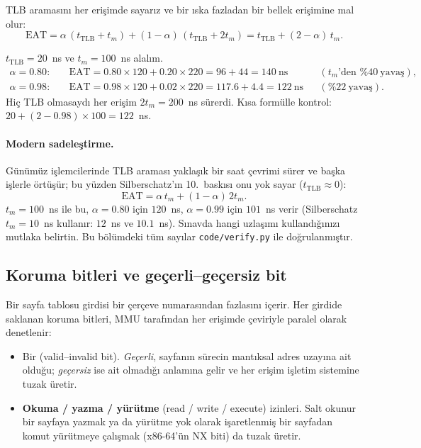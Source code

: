 \begin{keyidea}
TLB aramasını her erişimde sayarız ve bir ıska fazladan bir bellek erişimine mal olur:
\[
\text{EAT} = \alpha\,(t_{\text{TLB}} + t_{m}) + (1-\alpha)\,(t_{\text{TLB}} + 2t_{m}) = t_{\text{TLB}} + (2-\alpha)\,t_{m}.
\]
\end{keyidea}

\begin{example}
$t_{\text{TLB}} = 20$~ns ve $t_{m} = 100$~ns alalım.
\begin{align*}
\alpha = 0.80:&\quad \text{EAT} = 0.80 \times 120 + 0.20 \times 220 = 96 + 44 = 140\ \text{ns} &&(t_m\text{'den } \%40\ \text{yavaş}),\\
\alpha = 0.98:&\quad \text{EAT} = 0.98 \times 120 + 0.02 \times 220 = 117.6 + 4.4 = 122\ \text{ns} &&(\%22\ \text{yavaş}).
\end{align*}
Hiç TLB olmasaydı her erişim $2t_{m} = 200$~ns sürerdi. Kısa formülle kontrol: $20 + (2-0.98)\times100 = 122$~ns.
\end{example}

\paragraph{Modern sadeleştirme.} Günümüz işlemcilerinde TLB araması yaklaşık bir saat çevrimi sürer ve başka işlerle örtüşür; bu yüzden Silberschatz'ın 10.~baskısı onu yok sayar ($t_{\text{TLB}}\approx 0$):
\[
\text{EAT} = \alpha\,t_{m} + (1-\alpha)\,2t_{m}.
\]
$t_{m} = 100$~ns ile bu, $\alpha = 0.80$ için $120$~ns, $\alpha = 0.99$ için $101$~ns verir (Silberschatz $t_{m}=10$~ns kullanır: $12$~ns ve $10.1$~ns). Sınavda hangi uzlaşımı kullandığınızı mutlaka belirtin. Bu bölümdeki tüm sayılar \texttt{code/verify.py} ile doğrulanmıştır.

\subsection{Koruma bitleri ve geçerli--geçersiz bit}
\label{sec:protbits}

Bir sayfa tablosu girdisi bir çerçeve numarasından fazlasını içerir. Her girdide saklanan koruma bitleri, MMU tarafından her erişimde çeviriyle paralel olarak denetlenir:
\begin{itemize}
  \item Bir  (valid--invalid bit). \emph{Geçerli}, sayfanın sürecin mantıksal adres uzayına ait olduğu; \emph{geçersiz} ise ait olmadığı anlamına gelir ve her erişim işletim sistemine tuzak üretir.
  \item \textbf{Okuma / yazma / yürütme} (read / write / execute) izinleri. Salt okunur bir sayfaya yazmak ya da yürütme yok olarak işaretlenmiş bir sayfadan komut yürütmeye çalışmak (x86-64'ün NX biti) da tuzak üretir.
\end{itemize}

